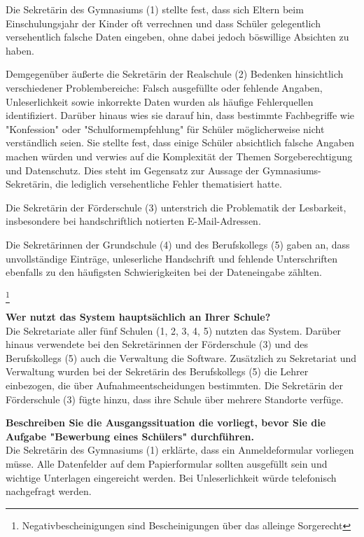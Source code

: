 Die Sekretärin des Gymnasiums (1) stellte fest, dass sich Eltern beim Einschulungsjahr der Kinder oft verrechnen und dass Schüler gelegentlich versehentlich falsche Daten eingeben, ohne dabei jedoch böswillige Absichten zu haben.

Demgegenüber äußerte die Sekretärin der Realschule (2) Bedenken hinsichtlich verschiedener Problembereiche: Falsch ausgefüllte oder fehlende Angaben, Unleserlichkeit sowie inkorrekte Daten wurden als häufige Fehlerquellen identifiziert. Darüber hinaus wies sie darauf hin, dass bestimmte Fachbegriffe wie "Konfession" oder "Schulformempfehlung" für Schüler möglicherweise nicht verständlich seien. Sie stellte fest, dass einige Schüler absichtlich falsche Angaben machen würden und verwies auf die Komplexität der Themen Sorgeberechtigung und Datenschutz. Dies steht im Gegensatz zur Aussage der Gymnasiums-Sekretärin, die lediglich versehentliche Fehler thematisiert hatte.

Die Sekretärin der Förderschule (3) unterstrich die Problematik der Lesbarkeit, insbesondere bei handschriftlich notierten E-Mail-Adressen.

Die Sekretärinnen der Grundschule (4) und des Berufskollegs (5) gaben an, dass unvollständige Einträge, unleserliche Handschrift und fehlende Unterschriften ebenfalls zu den häufigsten Schwierigkeiten bei der Dateneingabe zählten.

\footnote{Negativbescheinigungen sind Bescheinigungen über das alleinge Sorgerecht}


\textbf{Wer nutzt das System hauptsächlich an Ihrer Schule?}\\
Die Sekretariate aller fünf Schulen (1, 2, 3, 4, 5) nutzten das System. Darüber hinaus verwendete bei den Sekretärinnen der Förderschule (3) und des Berufskollegs (5) auch die Verwaltung die Software. Zusätzlich zu Sekretariat und Verwaltung wurden bei der Sekretärin des Berufskollegs (5) die Lehrer einbezogen, die über Aufnahmeentscheidungen bestimmten. Die Sekretärin der Förderschule (3) fügte hinzu, dass ihre Schule über mehrere Standorte verfüge.


\textbf{Beschreiben Sie die Ausgangssituation die vorliegt, bevor Sie die Aufgabe "Bewerbung eines Schülers" durchführen.}\\
Die Sekretärin des Gymnasiums (1) erklärte, dass ein Anmeldeformular vorliegen müsse. Alle Datenfelder auf dem Papierformular sollten ausgefüllt sein und wichtige Unterlagen eingereicht werden. Bei Unleserlichkeit würde telefonisch nachgefragt werden.

